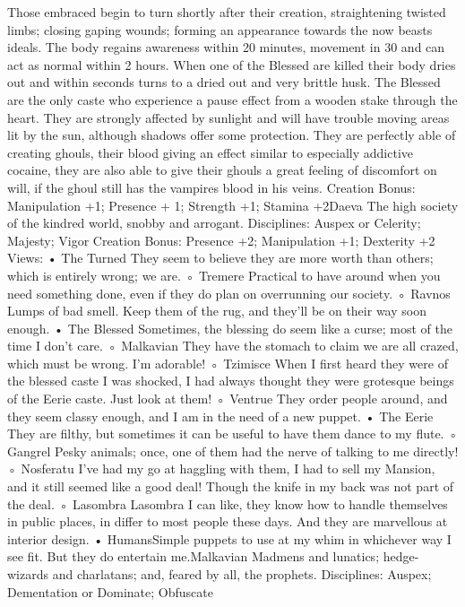\documentclass[10pt,a4paper]{article}
\begin{document}
Those embraced begin to turn shortly after their creation, straightening
twisted limbs; closing gaping wounds; forming an appearance towards the
now beasts ideals. The body regains awareness within 20 minutes,
movement in 30 and can act as normal within 2 hours.
When one of the Blessed are killed their body dries out and within seconds
turns to a dried out and very brittle husk.
The Blessed are the only caste who experience a pause effect from a
wooden stake through the heart. They are strongly affected by sunlight and
will have trouble moving areas lit by the sun, although shadows offer some
protection. They are perfectly able of creating ghouls, their blood giving an
effect similar to especially addictive cocaine, they are also able to give their
ghouls a great feeling of discomfort on will, if the ghoul still has the
vampires blood in his veins.
Creation Bonus:
Manipulation +1; Presence + 1; Strength +1; Stamina +2Daeva
The high society of the kindred world, snobby and arrogant.
Disciplines: Auspex or Celerity; Majesty; Vigor
Creation Bonus:
Presence +2; Manipulation +1; Dexterity +2
Views:
• The Turned
They seem to believe they are more worth than others; which is
entirely wrong; we are.
◦ Tremere
Practical to have around when you need something done, even if
they do plan on overrunning our society.
◦ Ravnos
Lumps of bad smell. Keep them of the rug, and they'll be on
their way soon enough.
• The Blessed
Sometimes, the blessing do seem like a curse; most of the time I
don't care.
◦ Malkavian
They have the stomach to claim we are all crazed, which must be
wrong. I'm adorable!
◦ Tzimisce
When I first heard they were of the blessed caste I was shocked,
I had always thought they were grotesque beings of the Eerie
caste. Just look at them!
◦ Ventrue
They order people around, and they seem classy enough, and I
am in the need of a new puppet.
• The Eerie
They are filthy, but sometimes it can be useful to have them dance to
my flute.
◦ Gangrel
Pesky animals; once, one of them had the nerve of talking to me
directly!
◦ Nosferatu
I've had my go at haggling with them, I had to sell my Mansion,
and it still seemed like a good deal! Though the knife in my back
was not part of the deal.
◦ Lasombra
Lasombra I can like, they know how to handle themselves in
public places, in differ to most people these days. And they are
marvellous at interior design.
• HumansSimple puppets to use at my whim in whichever way I see fit. But
they do entertain me.Malkavian
Madmens and lunatics; hedge-wizards and charlatans; and, feared by all, the
prophets.
Disciplines: Auspex; Dementation or Dominate; Obfuscate
\end{document}
